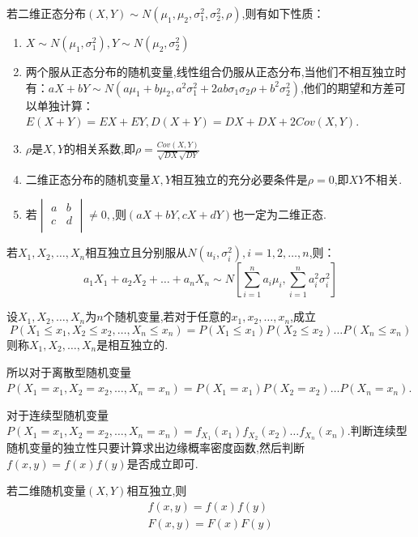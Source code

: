 若二维正态分布$(X,Y) \sim N(\mu_1,\mu_2,\sigma_1^2,\sigma_2^2,\rho)$,则有如下性质：
\begin{enumerate}
    \item $X\sim N(\mu_1,\sigma_1^2),Y\sim N(\mu_2,\sigma_2^2)$
    \item 两个服从正态分布的随机变量,线性组合仍服从正态分布,当他们不相互独立时有：$aX+bY\sim N(a\mu_1+b\mu_2,a^2\sigma_1^2+2ab\sigma_1\sigma_2\rho+b^2\sigma_2^2)$,他们的期望和方差可以单独计算：$E(X+Y)=EX+EY,D(X+Y)=DX+DX+2Cov(X,Y)$.
    \item $\rho$是$X,Y$的相关系数,即$\rho =\frac{Cov(X,Y)}{\sqrt{DX}\sqrt{DY}}$
    \item 二维正态分布的随机变量$X,Y$相互独立的充分必要条件是$\rho=0$,即$XY$不相关.
    \item 若$\begin{vmatrix}
    a   &   b   \\
    c   &   d   \\
    \end{vmatrix} \neq 0,$,则$(aX+bY,cX+dY)$也一定为二维正态.
\end{enumerate}

\begin{ttheorem}
    若$X_1,X_2,\dots,X_n$相互独立且分别服从$N(u_i,\sigma_i^2),i=1,2,\dots,n$,则：
\begin{equation*}
    a_1X_1+a_2X_2+\dots+a_nX_n \sim N \left[\sum_{i=1}^{n} a_i\mu_i,\sum_{i=1}^{n} a_i^2\sigma_i^2\right] 
\end{equation*}
\end{ttheorem}

\begin{definition}
    设$X_1,X_2,\dots,X_n$为$n$个随机变量,若对于任意的$x_1,x_2,\dots,x_n$,成立
    \begin{equation*}
        P(X_1 \leqslant x_1,X_2 \leqslant x_2,\dots,X_n \leqslant x_n)=P(X_1 \leqslant x_1)P(X_2 \leqslant x_2)\dots P(X_n \leqslant x_n)
    \end{equation*}
    则称$X_1,X_2,\dots,X_n$是相互独立的.
\end{definition}

所以对于离散型随机变量$P(X_1 = x_1,X_2 = x_2,\dots,X_n = x_n)=P(X_1 = x_1)P(X_2 = x_2)\dots P(X_n = x_n)$.

对于连续型随机变量$P(X_1 = x_1,X_2 = x_2,\dots,X_n = x_n)=f_{X_1}(x_1)f_{X_2}(x_2)\dots f_{X_n}(x_n)$.判断连续型随机变量的独立性只要计算求出边缘概率密度函数,然后判断$f(x,y)=f(x)f(y)$是否成立即可.

\begin{ttheorem}
    若二维随机变量$(X,Y)$相互独立,则
    \begin{gather*}
        f(x,y)=f(x)f(y)\\
        F(x,y)=F(x)F(y)
    \end{gather*}
\end{ttheorem}

